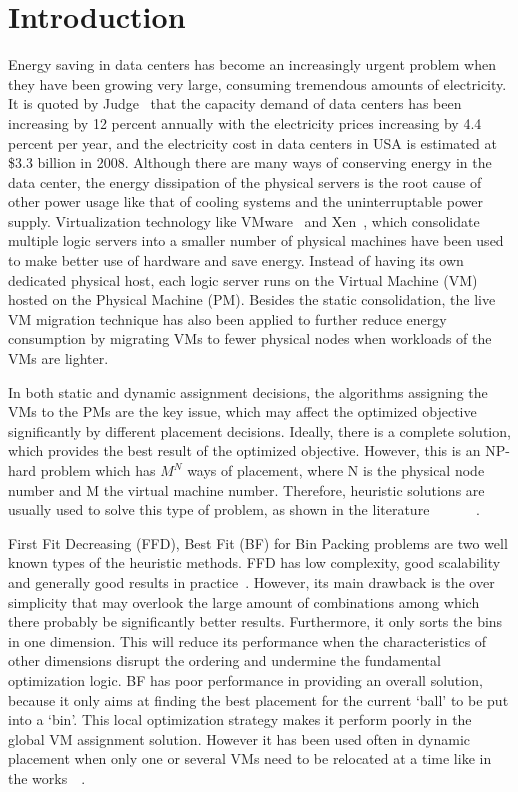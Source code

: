 \documentclass[10pt, conference, compsocconf]{IEEEtran}
\begin{document}
\section{Introduction}
Energy saving in data centers has become an increasingly urgent problem when
they have been growing very large, consuming tremendous amounts of electricity.
It is quoted by Judge~\cite{judge08} that the capacity demand of data centers
has been increasing by 12 percent annually with the electricity prices
increasing by 4.4 percent per year, and the electricity cost in data centers in
USA is estimated at \$3.3 billion in 2008. Although there are many ways of
conserving energy in the data center, the energy dissipation of the physical
servers is the root cause of other power usage like that of cooling systems and
the uninterruptable power supply. Virtualization technology like
VMware~\cite{vmware01} and Xen~\cite{xen01}, which consolidate multiple logic
servers into a smaller number of physical machines have been used to make better
use of hardware and save energy. Instead of having its own dedicated physical
host, each logic server runs on the Virtual Machine (VM) hosted on the Physical
Machine (PM).
Besides the static consolidation, the live VM migration technique has also been
applied to further reduce energy consumption by migrating VMs to fewer physical
nodes when workloads of the VMs are lighter.

In both static and dynamic assignment decisions, the algorithms
assigning the VMs to the PMs are the key issue, which may affect the optimized
objective significantly by different placement
decisions. Ideally, there is a complete solution, which provides the best result
of the optimized objective. However, this is an NP-hard problem which has
$M^{N}$ ways of placement, where N is the physical node number and M the virtual machine
number. Therefore, heuristic solutions are usually used to solve this type of
problem, as shown in the literature
~\cite{verma08}~\cite{verma09}~\cite{wood09}~\cite{kusic09}~\cite{stillwell10}~\cite{yao80}.

First Fit Decreasing (FFD), Best Fit (BF) for Bin Packing problems are two well
known types of the heuristic methods. FFD has low complexity, good scalability
and generally good results in practice~\cite{yao80}. However, its main drawback
is the over simplicity that may overlook the large amount of combinations among
which there probably be significantly better results. Furthermore, it only sorts
the bins in one dimension. This will reduce its performance when the
characteristics of other dimensions disrupt the ordering and undermine the
fundamental optimization logic. BF has poor performance in providing an overall
solution, because it only aims at finding the best placement for the current
`ball' to be put into a `bin'.
This local optimization strategy makes it perform poorly in the global VM
assignment solution.
However it has been used often in dynamic placement when only one or several VMs
need to be relocated at a time like in the
works~\cite{calheiros11}~\cite{beloglazov10}.
\end{document}
